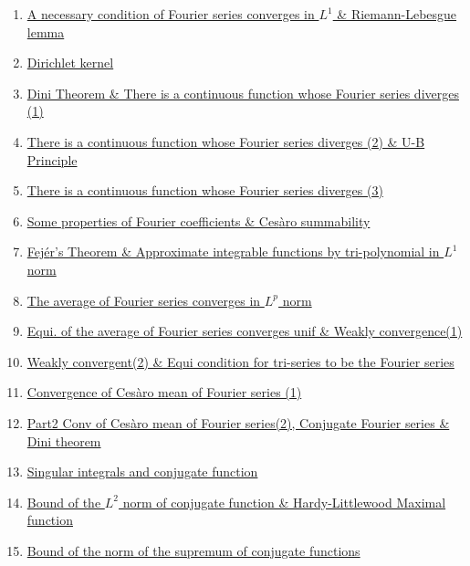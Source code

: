 \documentclass[11pt]{article}
\begin{document}
\begin{enumerate}
	\item 	\href{https://mp.weixin.qq.com/s/5GYYVkDfA4MtwhyK_0kDxg}{A necessary condition of Fourier series converges in $L^1$ \& Riemann-Lebesgue lemma}	%
	\item 	\href{https://mp.weixin.qq.com/s/tGHTKUqhFm75t9k3CcjLJA}{Dirichlet kernel}	%
	\item 	\href{https://mp.weixin.qq.com/s/ZD8yJLLhrL6oyO4NBuNL3g}{Dini Theorem \& There is a continuous function whose Fourier series diverges (1)}	%
	\item 	\href{https://mp.weixin.qq.com/s/oKttb__jq2pKibQdCnYIaQ}{There is a continuous function whose Fourier series diverges (2) \& U-B Principle}	%
	\item 	\href{https://mp.weixin.qq.com/s/rU_2kcw87mMTQuXjp9fUsg}{There is a continuous function whose Fourier series diverges (3)}	%
	\item 	\href{https://mp.weixin.qq.com/s/87XlLeL26f3vOXPBRmddpw}{Some properties of Fourier coefficients \& Ces{\`a}ro summability}	%
	\item	\href{https://mp.weixin.qq.com/s/kgk7MZTcNpfu08XCIQ6t-g}{Fej{\'e}r's Theorem \& Approximate integrable functions by tri-polynomial in $L^1$ norm}	%
	\item	\href{https://mp.weixin.qq.com/s/WM8zcUumRN9p9GYxwXrwcA}{The average of Fourier series converges in $L^p$ norm}	%
	\item	\href{https://mp.weixin.qq.com/s/7SOCAwFJl6shN7zZYzxawA}{Equi. of the average of Fourier series converges unif \& Weakly convergence(1)} 	%
	\item 	\href{https://mp.weixin.qq.com/s/l9FCzc3oqCubRO9Lahw-1A}{Weakly convergent(2) \& Equi condition for tri-series to be the Fourier series}	%
	\item 	\href{https://mp.weixin.qq.com/s/AwlsQ6712yUi8sZOBSKsoQ}{Convergence of Ces{\`a}ro mean of Fourier series (1)}	%
	\item 	\href{https://mp.weixin.qq.com/s/UAJ-SlyftrjAhJLYvweyLA}{Part2 Conv of Ces{\`a}ro mean of Fourier series(2), Conjugate Fourier series \& Dini theorem}	%
	\item 	\href{https://mp.weixin.qq.com/s/mA4UFcgAXrz3RDs4U-ObXg}{Singular integrals and conjugate function}	%
	\item 	\href{https://mp.weixin.qq.com/s/oWeNCTB67MkHA9K_RBhAnQ}{Bound of the $L^2$ norm of conjugate function \& Hardy-Littlewood Maximal function}	%
	\item 	\href{https://mp.weixin.qq.com/s/A6kNkEUNTW_L4yA_VXEzOg}{Bound of the norm of the supremum of conjugate functions}	%

\end{enumerate}
\end{document}
